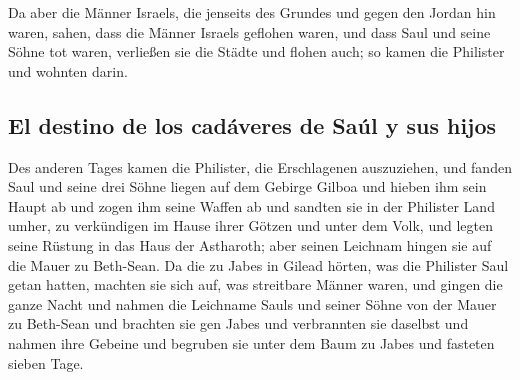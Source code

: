  Da aber die Männer Israels, die jenseits des Grundes und
gegen den Jordan hin waren, sahen, dass die Männer Israels geflohen
waren, und dass Saul und seine Söhne tot waren, verließen sie die Städte
und flohen auch; so kamen die Philister und wohnten darin.

\hypertarget{el-destino-de-los-caduxe1veres-de-sauxfal-y-sus-hijos}{%
\subsection{El destino de los cadáveres de Saúl y sus
hijos}\label{el-destino-de-los-caduxe1veres-de-sauxfal-y-sus-hijos}}

 Des anderen Tages kamen die Philister, die Erschlagenen
auszuziehen, und fanden Saul und seine drei Söhne liegen auf dem Gebirge
Gilboa  und hieben ihm sein Haupt ab und zogen ihm seine
Waffen ab und sandten sie in der Philister Land umher, zu verkündigen im
Hause ihrer Götzen und unter dem Volk,  und legten seine
Rüstung in das Haus der Astharoth; aber seinen Leichnam hingen sie auf
die Mauer zu Beth-Sean.  Da die zu Jabes in Gilead
hörten, was die Philister Saul getan hatten,  machten sie
sich auf, was streitbare Männer waren, und gingen die ganze Nacht und
nahmen die Leichname Sauls und seiner Söhne von der Mauer zu Beth-Sean
und brachten sie gen Jabes und verbrannten sie daselbst 
und nahmen ihre Gebeine und begruben sie unter dem Baum zu Jabes und
fasteten sieben Tage.
